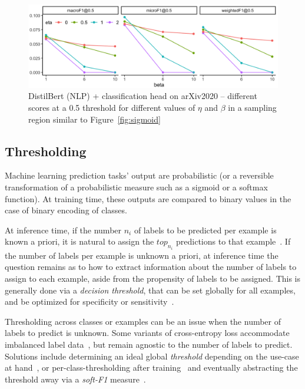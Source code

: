 \begin{figure}[t!]
\centering
\includegraphics[width=.9\linewidth]{./images/betaEtaResized.png}
\vspace{1\baselineskip}
\caption{\label{fig:betaEta}
DistilBert (NLP) + classification head on arXiv2020 – different scores at a 0.5 threshold for different values of $\eta$ and $\beta$ in a sampling region similar to Figure~\ref{fig:sigmoid}}
\end{figure}

\subsection{Thresholding}
\label{subsec:thresh}

Machine learning prediction tasks' output are probabilistic (or a reversible transformation of a probabilistic measure such as a sigmoid or a softmax function).
At training time, these outputs are compared to binary
values in the case of binary encoding of classes.

At inference time, if the number $n_i$ of labels to be predicted per example is known a priori, it is natural to assign the $top_{n_i}$ predictions to that example~\cite{lossTopKError, topKmulticlassSVM}.
If the number of labels per example is unknown a priori,  at inference time the question remains as to how to extract information about the number of labels to assign to each example, aside from the propensity of labels to be assigned.
This is generally done via a \emph{decision threshold}, that can be set globally for all examples, and be optimized for specificity or sensitivity~\cite{decisionThreshold}.

Thresholding across classes or examples can be an issue when the number of labels to predict is unknown. Some variants of cross-entropy loss accommodate imbalanced label data~\cite{focalLoss}, but remain agnostic to the number of labels to predict.
Solutions include determining an ideal global \emph{threshold} depending on the use-case at hand~\cite{threshForF1}, or per-class-thresholding after training~\cite{moviePosters} and eventually abstracting the threshold away via a \emph{soft-F1} measure~\cite{softF1}.

